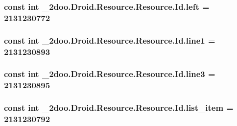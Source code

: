 \hypertarget{class__2doo_1_1_droid_1_1_resource_1_1_id_47c7353ca16a7d08b1ec441e148f4809}{
\subsubsection[{left}]{\setlength{\rightskip}{0pt plus 5cm}const int \_\-2doo.Droid.Resource.Resource.Id.left = 2131230772}}
\label{class__2doo_1_1_droid_1_1_resource_1_1_id_47c7353ca16a7d08b1ec441e148f4809}


\hypertarget{class__2doo_1_1_droid_1_1_resource_1_1_id_b14e4098ff800ec4386b6ed829c61aeb}{
\subsubsection[{line1}]{\setlength{\rightskip}{0pt plus 5cm}const int \_\-2doo.Droid.Resource.Resource.Id.line1 = 2131230893}}
\label{class__2doo_1_1_droid_1_1_resource_1_1_id_b14e4098ff800ec4386b6ed829c61aeb}


\hypertarget{class__2doo_1_1_droid_1_1_resource_1_1_id_536efc146736a7321401458bd39f35df}{
\subsubsection[{line3}]{\setlength{\rightskip}{0pt plus 5cm}const int \_\-2doo.Droid.Resource.Resource.Id.line3 = 2131230895}}
\label{class__2doo_1_1_droid_1_1_resource_1_1_id_536efc146736a7321401458bd39f35df}


\hypertarget{class__2doo_1_1_droid_1_1_resource_1_1_id_120d812f13347b4300f75e91276055df}{
\subsubsection[{list\_\-item}]{\setlength{\rightskip}{0pt plus 5cm}const int \_\-2doo.Droid.Resource.Resource.Id.list\_\-item = 2131230792}}
\label{class__2doo_1_1_droid_1_1_resource_1_1_id_120d812f13347b4300f75e91276055df}


